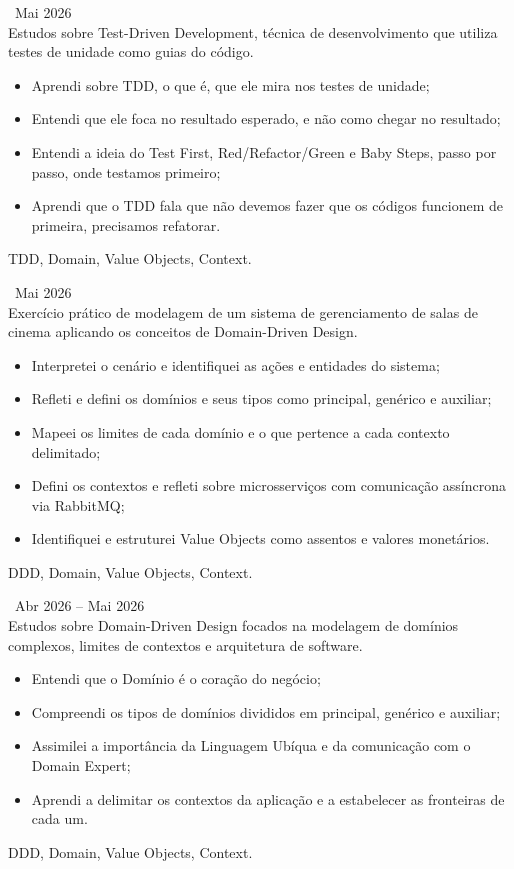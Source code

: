         
 \hfill\ Mai 2026 \\
Estudos sobre Test-Driven Development, técnica de desenvolvimento que utiliza testes de unidade como guias do código.
\begin{itemize}
    \item Aprendi sobre TDD, o que é, que ele mira nos testes de unidade;
    \item Entendi que ele foca no resultado esperado, e não como chegar no resultado;
    \item Entendi a ideia do Test First, Red/Refactor/Green e Baby Steps, passo por passo, onde testamos primeiro;
    \item Aprendi que o TDD fala que não devemos fazer que os códigos funcionem de primeira, precisamos refatorar.
\end{itemize}
 TDD, Domain, Value Objects, Context.

        
 \hfill\ Mai 2026 \\
Exercício prático de modelagem de um sistema de gerenciamento de salas de cinema aplicando os conceitos de Domain-Driven Design.
\begin{itemize}
    \item Interpretei o cenário e identifiquei as ações e entidades do sistema;
    \item Refleti e defini os domínios e seus tipos como principal, genérico e auxiliar;
    \item Mapeei os limites de cada domínio e o que pertence a cada contexto delimitado;
    \item Defini os contextos e refleti sobre microsserviços com comunicação assíncrona via RabbitMQ;
    \item Identifiquei e estruturei Value Objects como assentos e valores monetários.
\end{itemize}
 DDD, Domain, Value Objects, Context.

        
 \hfill\ Abr 2026 -- Mai 2026 \\
Estudos sobre Domain-Driven Design focados na modelagem de domínios complexos, limites de contextos e arquitetura de software.
\begin{itemize}
    \item Entendi que o Domínio é o coração do negócio;
    \item Compreendi os tipos de domínios divididos em principal, genérico e auxiliar;
    \item Assimilei a importância da Linguagem Ubíqua e da comunicação com o Domain Expert;
    \item Aprendi a delimitar os contextos da aplicação e a estabelecer as fronteiras de cada um.
\end{itemize}
 DDD, Domain, Value Objects, Context.

